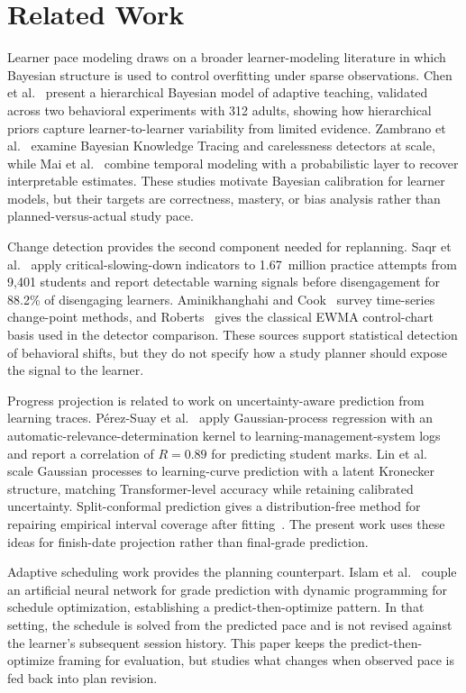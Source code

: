 \documentclass[conference]{IEEEtran}
\begin{document}
\section{Related Work}
Learner pace modeling draws on a broader learner-modeling literature in which Bayesian structure is used to control overfitting under sparse observations. Chen et al.~\cite{chen2024} present a hierarchical Bayesian model of adaptive teaching, validated across two behavioral experiments with 312 adults, showing how hierarchical priors capture learner-to-learner variability from limited evidence. Zambrano et al.~\cite{zambrano2024} examine Bayesian Knowledge Tracing and carelessness detectors at scale, while Mai et al.~\cite{mai2025} combine temporal modeling with a probabilistic layer to recover interpretable estimates. These studies motivate Bayesian calibration for learner models, but their targets are correctness, mastery, or bias analysis rather than planned-versus-actual study pace.

Change detection provides the second component needed for replanning. Saqr et al.~\cite{saqr2026} apply critical-slowing-down indicators to 1.67~million practice attempts from 9{,}401 students and report detectable warning signals before disengagement for 88.2\% of disengaging learners. Aminikhanghahi and Cook~\cite{aminikhanghahi2017} survey time-series change-point methods, and Roberts~\cite{roberts1959} gives the classical EWMA control-chart basis used in the detector comparison. These sources support statistical detection of behavioral shifts, but they do not specify how a study planner should expose the signal to the learner.

Progress projection is related to work on uncertainty-aware prediction from learning traces. P\'erez-Suay et al.~\cite{perezsuay2024} apply Gaussian-process regression with an automatic-relevance-determination kernel to learning-management-system logs and report a correlation of $R=0.89$ for predicting student marks. Lin et al.~\cite{lin2024} scale Gaussian processes to learning-curve prediction with a latent Kronecker structure, matching Transformer-level accuracy while retaining calibrated uncertainty. Split-conformal prediction gives a distribution-free method for repairing empirical interval coverage after fitting~\cite{angelopoulos2023}. The present work uses these ideas for finish-date projection rather than final-grade prediction.

Adaptive scheduling work provides the planning counterpart. Islam et al.~\cite{islam2024} couple an artificial neural network for grade prediction with dynamic programming for schedule optimization, establishing a predict-then-optimize pattern. In that setting, the schedule is solved from the predicted pace and is not revised against the learner's subsequent session history. This paper keeps the predict-then-optimize framing for evaluation, but studies what changes when observed pace is fed back into plan revision.
\end{document}
